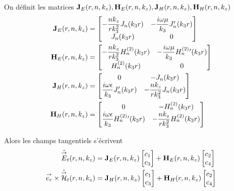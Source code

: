   \newcommand{\mJ}{\mat{J}}
  \newcommand{\mH}{\mat{H}}

  \begin{defn}
    On définit les matrices \(\mJ_{E}(r,n,k_z),\mH_{E}(r,n,k_z),\mJ_{H}(r,n,k_z),\mH_{H}(r,n,k_z)\)
    \begin{align}
      \mJ_{E}(r,n,k_z) &=
      \begin{bmatrix}
        -\frac{nk_z}{rk_3^2}J_n(k_3r) & -\frac{i\w\mu}{k_3}J_n'(k_3r)
        \\
        J_n(k_3r) & 0
      \end{bmatrix}
      \\
      \mH_{E}(r,n,k_z) &=
      \begin{bmatrix}
        -\frac{nk_z}{rk_3^2}H_n^{(2)}(k_3r) & -\frac{i\w\mu}{k_3}H_n^{(2)}{}'(k_3r)
        \\
        H_n^{(2)}(k_3r) & 0
      \end{bmatrix}
      \\
      \mJ_{H}(r,n,k_z) &=
      \begin{bmatrix}
        0 & -J_n(k_3r)
        \\
        \frac{i\w\eps}{k_3}J_n'(k_3r) & -\frac{nk_z}{rk_3^2}J_n(k_3r)
      \end{bmatrix}
      \\
      \mH_{H}(r,n,k_z) &=
      \begin{bmatrix}
        0 & -H_n^{(2)}(k_3r)
        \\
        \frac{i\w\eps}{k_3}H_n^{(2)}{}'(k_3r) & -\frac{nk_z}{rk_3^2}H_n^{(2)}(k_3r)
      \end{bmatrix}
    \end{align}
  \end{defn}

  \begin{prop}
    Alors les champs tangentiels s'écrivent
    \begin{subequations}
      \begin{align}
        \hat \vE_t(r,n,k_z) &= \mJ_{E}(r,n,k_z)
        \begin{bmatrix}
          c_1 \\
          c_3
        \end{bmatrix}
        +
        \mH_{E}(r,n,k_z)
        \begin{bmatrix}
          c_2 \\
          c_4
        \end{bmatrix}
        \label{eq:imp_fourier:cylindre:Et}\\
        \vect{e_r}\times\hat \vH_t(r,n,k_z) &=
        \mJ_{H}(r,n,k_z)
        \begin{bmatrix}
          c_1 \\
          c_3
        \end{bmatrix}
        +
        \mH_{H}(r,n,k_z)
        \begin{bmatrix}
          c_2 \\
          c_4
        \end{bmatrix}
        \label{eq:imp_fourier:cylindre:Ht}
      \end{align}
    \end{subequations}
  \end{prop}


